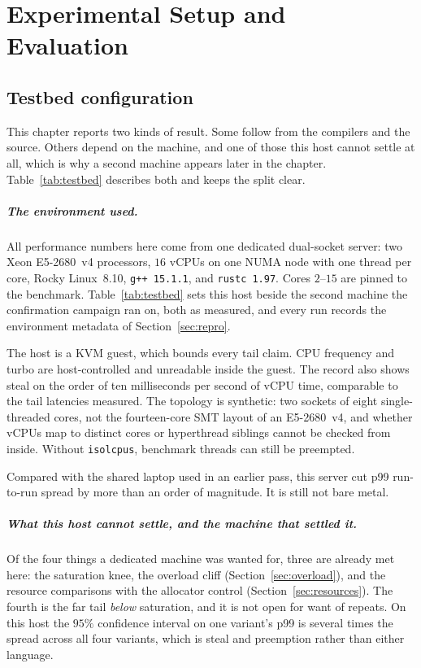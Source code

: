\documentclass[english,oneside,a4paper,censored,csm,software-track-2020]{HYthesisML}
\begin{document}
\chapter{Experimental Setup and Evaluation\label{chapter:eval}}

\section{Testbed configuration\label{sec:testbed}}
This chapter reports two kinds of result. Some follow from the compilers and the source. Others
depend on the machine, and one of those this host cannot settle at all, which is why a second
machine appears later in the chapter. Table~\ref{tab:testbed} describes both and keeps the split
clear.

\paragraph{The environment used.}
All performance numbers here come from one dedicated dual-socket server: two Xeon E5-2680~v4
processors, $16$ vCPUs on one NUMA node with one thread per core, Rocky Linux~8.10,
\texttt{g++~15.1.1}, and \texttt{rustc~1.97}. Cores $2$--$15$ are pinned to the benchmark.
Table~\ref{tab:testbed} sets this host beside the second machine the confirmation campaign ran on,
both as measured, and every run records the environment metadata of Section~\ref{sec:repro}.

The host is a KVM guest, which bounds every tail claim. CPU frequency and turbo are
host-controlled and unreadable inside the guest. The record also shows steal on the order of ten
milliseconds per second of vCPU time, comparable to the tail latencies measured. The topology
is synthetic: two sockets of eight single-threaded cores, not the fourteen-core SMT layout of an
E5-2680~v4, and whether vCPUs map to distinct cores or hyperthread siblings cannot be checked
from inside. Without \texttt{isolcpus}, benchmark threads can still be preempted.

Compared with the shared laptop used in an earlier pass, this server cut p99 run-to-run spread by
more than an order of magnitude. It is still not bare metal.

\paragraph{What this host cannot settle, and the machine that settled it.}
Of the four things a dedicated machine was wanted for, three are already met here: the saturation
knee, the overload cliff (Section~\ref{sec:overload}), and the resource comparisons with the
allocator control (Section~\ref{sec:resources}). The fourth is the far tail \emph{below}
saturation, and it is not open for want of repeats. On this host the $95\%$ confidence interval on
one variant's p99 is several times the spread across all four variants, which is steal and
preemption rather than either language.
\end{document}
